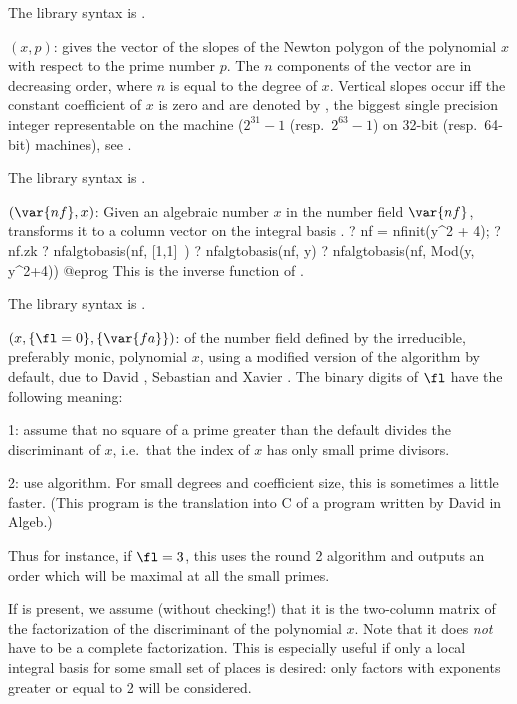 The library syntax is .

$(x,p)$: \label{se:newtonpoly}gives the vector of the slopes of the Newton
polygon of the polynomial $x$ with respect to the prime number $p$. The $n$
components of the vector are in decreasing order, where $n$ is equal to the
degree of $x$. Vertical slopes occur iff the constant coefficient of $x$ is
zero and are denoted by , the biggest single precision
integer representable on the machine ($2^{31}-1$ (resp.~$2^{63}-1$) on 32-bit
(resp.~64-bit) machines), see .

The library syntax is .

$(\var{nf},x)$: \label{se:nfalgtobasis}Given an algebraic number $x$ in the number field $\var{nf}$,
transforms it to a column vector on the integral basis .
\bprog
? nf = nfinit(y^2 + 4);
? nf.zk
? nfalgtobasis(nf, [1,1]~)
? nfalgtobasis(nf, y)
? nfalgtobasis(nf, Mod(y, y^2+4))
@eprog
This is the inverse function of .

The library syntax is .

$(x,\{\fl=0\},\{\var{fa}\})$: \label{se:nfbasis} of the number
field defined by the irreducible, preferably monic, polynomial $x$, using a
modified version of the  algorithm by default, due to David
, Sebastian  and Xavier . The binary digits
of $\fl$ have the following meaning:

1: assume that no square of a prime greater than the default 
divides the discriminant of $x$, i.e.~that the index of $x$ has only small
prime divisors.

2: use  algorithm. For small degrees and coefficient size, this
is sometimes a little faster. (This program is the translation into C of a
program written by David  in Algeb.)

Thus for instance, if $\fl=3$, this uses the round 2 algorithm and outputs
an order which will be maximal at all the small primes.

If  is present, we assume (without checking!) that it is the two-column
matrix of the factorization of the discriminant of the polynomial $x$. Note
that it does \emph{not} have to be a complete factorization. This is
especially useful if only a local integral basis for some small set of places
is desired: only factors with exponents greater or equal to 2 will be
considered.

